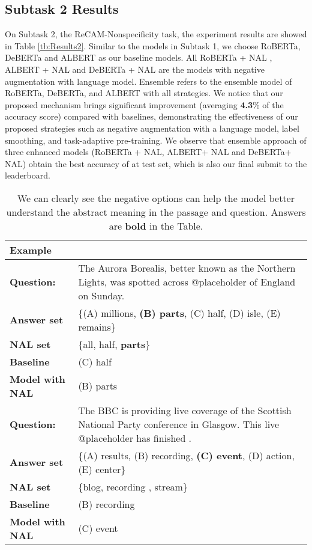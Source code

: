 \documentclass[11pt,a4paper]{article}
\begin{document}
\subsection{Subtask 2 Results}
On Subtask 2, the ReCAM-Nonspecificity task, the experiment results are showed in Table \ref{tb:Results2}.
Similar to the models in Subtask 1, we choose RoBERTa, DeBERTa and ALBERT as our baseline models.
All RoBERTa + NAL , ALBERT + NAL and DeBERTa + NAL 
are the models with negative augmentation with language model.
Ensemble refers to the ensemble model of RoBERTa, DeBERTa, and ALBERT with all strategies.
We notice that our proposed mechanism brings significant improvement  (averaging \textbf{4.3}\% of the accuracy score) compared with baselines, demonstrating the effectiveness of our proposed strategies such as negative augmentation with a language model, label smoothing, and task-adaptive pre-training.
We observe that ensemble approach of three enhanced models (RoBERTa + NAL, ALBERT+ NAL and DeBERTa+ NAL) obtain the best accuracy of  at test set, which is also our final submit to the leaderboard.

\begin{table*}[!thbp]
\centering
\begin{tabularx}{1\textwidth}{p{3cm}  X}
\toprule[1pt]
\textbf{Example} & 
\\
\hline
\textbf{Question:} & The Aurora Borealis, better known as the Northern Lights, was spotted across @placeholder of England on Sunday.
\\
\textbf{Answer set} & \{(A) millions, \textbf{(B) parts}, (C) half, (D) isle, (E) remains\}  \\
\textbf{NAL set} & \{all, half, \textbf{parts}\} \\
\textbf{Baseline} & (C) half \\
\textbf{Model with NAL} &  (B) parts \\
\hline
\textbf{Question:} & The BBC is providing live coverage of the Scottish National Party conference in Glasgow. This live @placeholder has finished .
\\
\textbf{Answer set} & \{(A) results, (B) recording, \textbf{(C) event}, (D) action, (E) center\}  \\
\textbf{NAL set} & \{blog, recording , stream\} \\
\textbf{Baseline} & (B) recording \\
\textbf{Model with NAL} &  (C) event \\
\toprule[1pt]
\end{tabularx} 
\caption{\label{font-table} We can clearly see the negative options can help the model better understand the abstract meaning in the passage and question. Answers are \textbf{bold} in the Table. }
\label{tb:NAL-example}
\end{table*}
\end{document}
